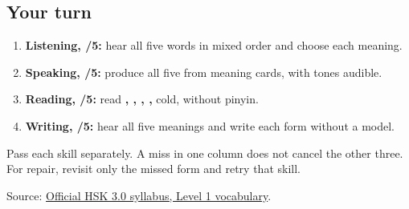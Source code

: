 \subsection*{Your turn}
\begin{enumerate}
\raggedright
  \item \textbf{Listening, /5:} hear all five words in mixed order and choose each meaning.
  \item \textbf{Speaking, /5:} produce all five from meaning cards, with tones audible.
  \item \textbf{Reading, /5:} read \textbf{, , , , } cold, without pinyin.
  \item \textbf{Writing, /5:} hear all five meanings and write each form without a model.
\end{enumerate}

Pass each skill separately. A miss in one column does not cancel the other three. For repair, revisit only the missed form and retry that skill.

\begin{tcolorbox}[breakable,colback=teal!4,colframe=teal!35!black,title={Before you move on}]
Source: \href{https://hsk.cn-bj.ufileos.com/3.0/\%E6\%96\%B0\%E7\%89\%88HSK\%E8\%80\%83\%E8\%AF\%95\%E5\%A4\%A7\%E7\%BA\%B21219.pdf}{Official HSK 3.0 syllabus, Level 1 vocabulary}.
\end{tcolorbox}
